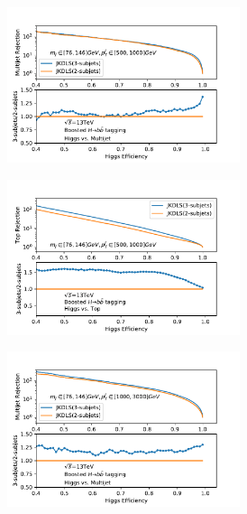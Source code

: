 \begin{figure}[htbp]
\begin{subfigure}{.5\textwidth}
     \caption{}
   \label{fig:}
  \end{subfigure}
 \newline 
   \begin{subfigure}{.5\textwidth}
  \centering
   \includegraphics[width=0.75\textwidth]{figuresXbb/Subjet/SUBQCDMASSPT2.pdf}
     \caption{}
   \label{fig:}
  \end{subfigure}
  \begin{subfigure}{.5\textwidth}
  \centering
   \includegraphics[width=0.75\textwidth]{figuresXbb/Subjet/SUBTopMASSPT2.pdf}
     \caption{}
   \label{fig:}
  \end{subfigure}
 \newline 
   \begin{subfigure}{.5\textwidth}
  \centering
   \includegraphics[width=0.75\textwidth]{figuresXbb/Subjet/SUBQCDMASSPT3.pdf}

\end{subfigure}
\end{figure}
